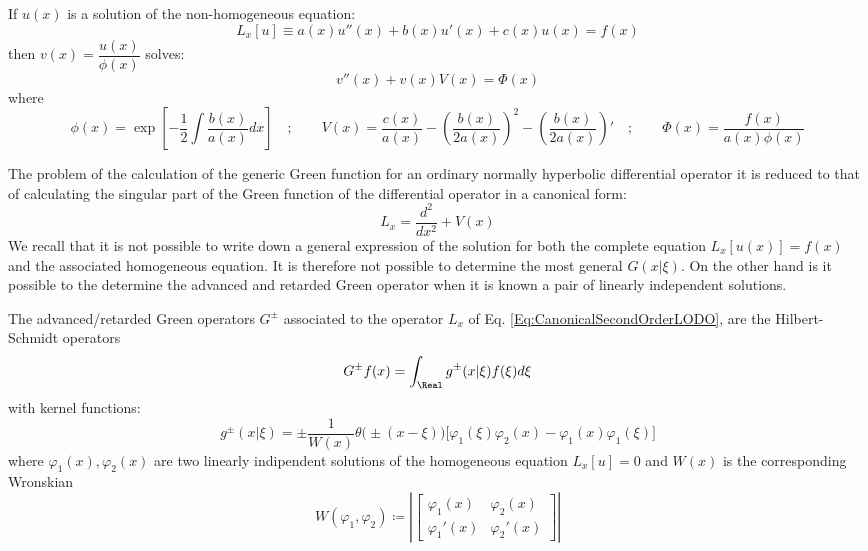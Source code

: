 \documentclass[Main]{subfiles}
\begin{document}
	\begin{proposition}
	If $u(x)$ is a solution of the non-homogeneous equation:
	\begin{displaymath}
		L_x[u] \equiv a(x) u''(x) + b(x) u'(x) + c(x) u(x) = f(x)
	\end{displaymath}
	then $v(x) =  \dfrac{u(x)}{\phi(x)}$ solves:
	\begin{displaymath}
		v''(x) +v(x) V(x) = \Phi(x)
	\end{displaymath}
	where
	\begin{displaymath}
		{\scriptstyle
		\phi(x) =  \exp \left[-\frac{1}{2}\int \frac{b(x)}{a(x)}dx \right] \quad ; \qquad
		V(x) = \frac{c(x)}{a(x)} - \left( \frac{b(x)}{2a(x)} \right)^2 - \left( \frac{b(x)}{2a(x)} \right)' \quad ; \qquad
		\Phi(x) = \frac{f(x)}{a(x) \phi(x)}}
	\end{displaymath}
	\end{proposition}
	The problem of the calculation of the generic Green function for an ordinary normally hyperbolic differential operator it is reduced to that of calculating the singular part of the Green function of the differential operator in a canonical form:
	\begin{equation}\label{Eq:CanonicalSecondOrderLODO}
		L_x=  \frac{d^2}{dx^2} + V(x)
	\end{equation}
	We recall that it is not possible to write down a general expression of the solution for both the complete equation $L_x\left[u(x)\right] = f(x)$ and the associated homogeneous equation. It is therefore not possible to determine the most general $G(x\vert \xi)$.
	On the other hand is it possible to the determine the advanced and retarded Green operator when it is known a pair of linearly independent solutions.
	\begin{proposition}
		The advanced/retarded Green operators $G^\pm$ associated to the operator $L_x$ of Eq. \ref{Eq:CanonicalSecondOrderLODO},
		are the Hilbert-Schmidt operators
		\begin{displaymath}
			G^\pm f(x) = \int_\Real g^\pm (x \vert \xi) f(\xi) d \xi
		\end{displaymath}
		with kernel functions:
		\begin{equation}\label{Eq:AdvRetGreenFunction}
			g^\pm ( x \vert \xi ) =
			\pm \frac{1}{W(x)} \theta\big( \pm ( x-\xi) \big) \big[ \varphi_1(\xi)\varphi_2(x) - \varphi_1(x)\varphi_1(\xi) \big]
		\end{equation}
		where $\varphi_1(x) , \varphi_2(x)$ are two linearly indipendent solutions of  the homogeneous equation $L_x[u]=0$ and $W(x)$ is the corresponding Wronskian
		\begin{displaymath}
			W(\varphi_1 , \varphi_2) \coloneqq \left\vert
				\begin{bmatrix}
        			\varphi_1(x)	&	\varphi_2(x) \\
        			\varphi_1'(x)	&	\varphi_2'(x)
     			\end{bmatrix}
     		\right\vert
		\end{displaymath}
	\end{proposition}
\end{document}
